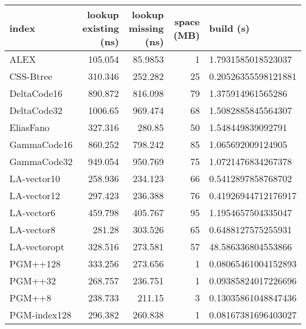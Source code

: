 \begin{tabular}{lrrrl}
\hline
 index             &   lookup existing (ns) &   lookup missing (ns) &   space (MB) & build (s)            \\
\hline
 ALEX              &               105.054  &               85.9853 &            1 & 1.7931585018523037   \\
 CSS-Btree         &               310.346  &              252.282  &           25 & 0.20526355598121881  \\
 DeltaCode16       &               890.872  &              816.098  &           79 & 1.375914961565286    \\
 DeltaCode32       &              1006.65   &              969.474  &           68 & 1.5082885845564307   \\
 EliasFano         &               327.316  &              280.85   &           50 & 1.548449839092791    \\
 GammaCode16       &               860.252  &              798.242  &           85 & 1.065692009124905    \\
 GammaCode32       &               949.054  &              950.769  &           75 & 1.0721476834267378   \\
 LA-vector10       &               258.936  &              234.123  &           66 & 0.5412897858768702   \\
 LA-vector12       &               297.423  &              236.388  &           76 & 0.41926944712176917  \\
 LA-vector6        &               459.798  &              405.767  &           95 & 1.1954657504335047   \\
 LA-vector8        &               281.28   &              303.526  &           65 & 0.6488127575255931   \\
 LA-vectoropt      &               328.516  &              273.581  &           57 & 48.586336804553866   \\
 PGM++128          &               333.256  &              273.656  &            1 & 0.08065461004152893  \\
 PGM++32           &               268.757  &              236.751  &            1 & 0.09385824017226696  \\
 PGM++8            &               238.733  &              211.15   &            3 & 0.13035861048847436  \\
 PGM-index128      &               296.382  &              260.838  &            1 & 0.08167381696403027  \\

\end{tabular}

